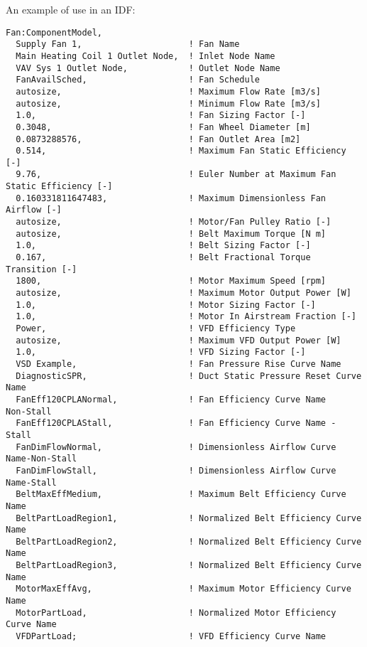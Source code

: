 An example of use in an IDF:

\begin{lstlisting}
Fan:ComponentModel,
  Supply Fan 1,                     ! Fan Name
  Main Heating Coil 1 Outlet Node,  ! Inlet Node Name
  VAV Sys 1 Outlet Node,            ! Outlet Node Name
  FanAvailSched,                    ! Fan Schedule
  autosize,                         ! Maximum Flow Rate [m3/s]
  autosize,                         ! Minimum Flow Rate [m3/s]
  1.0,                              ! Fan Sizing Factor [-]
  0.3048,                           ! Fan Wheel Diameter [m]
  0.0873288576,                     ! Fan Outlet Area [m2]
  0.514,                            ! Maximum Fan Static Efficiency [-]
  9.76,                             ! Euler Number at Maximum Fan Static Efficiency [-]
  0.160331811647483,                ! Maximum Dimensionless Fan Airflow [-]
  autosize,                         ! Motor/Fan Pulley Ratio [-]
  autosize,                         ! Belt Maximum Torque [N m]
  1.0,                              ! Belt Sizing Factor [-]
  0.167,                            ! Belt Fractional Torque Transition [-]
  1800,                             ! Motor Maximum Speed [rpm]
  autosize,                         ! Maximum Motor Output Power [W]
  1.0,                              ! Motor Sizing Factor [-]
  1.0,                              ! Motor In Airstream Fraction [-]
  Power,                            ! VFD Efficiency Type
  autosize,                         ! Maximum VFD Output Power [W]
  1.0,                              ! VFD Sizing Factor [-]
  VSD Example,                      ! Fan Pressure Rise Curve Name
  DiagnosticSPR,                    ! Duct Static Pressure Reset Curve Name
  FanEff120CPLANormal,              ! Fan Efficiency Curve Name     Non-Stall
  FanEff120CPLAStall,               ! Fan Efficiency Curve Name - Stall
  FanDimFlowNormal,                 ! Dimensionless Airflow Curve Name-Non-Stall
  FanDimFlowStall,                  ! Dimensionless Airflow Curve Name-Stall
  BeltMaxEffMedium,                 ! Maximum Belt Efficiency Curve Name
  BeltPartLoadRegion1,              ! Normalized Belt Efficiency Curve Name
  BeltPartLoadRegion2,              ! Normalized Belt Efficiency Curve Name
  BeltPartLoadRegion3,              ! Normalized Belt Efficiency Curve Name
  MotorMaxEffAvg,                   ! Maximum Motor Efficiency Curve Name
  MotorPartLoad,                    ! Normalized Motor Efficiency Curve Name
  VFDPartLoad;                      ! VFD Efficiency Curve Name
\end{lstlisting}

